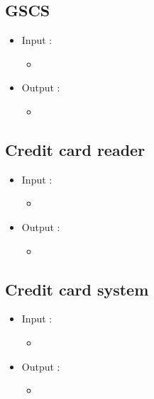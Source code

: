 \documentclass[11pt, a4paper]{article}
\begin{document}
\subsection{GSCS}

\begin{itemize}
\item Input :
		\begin{itemize}
		\item 
		\end{itemize}

\item Output :
		\begin{itemize}
		\item 
		\end{itemize}
\end{itemize}



\subsection{Credit card reader}

\begin{itemize}
\item Input :
		\begin{itemize}
		\item 
		\end{itemize}

\item Output :
		\begin{itemize}
		\item 
		\end{itemize}
\end{itemize}



\subsection{Credit card system}

\begin{itemize}
\item Input :
		\begin{itemize}
		\item 
		\end{itemize}

\item Output :
		\begin{itemize}
		\item 
		\end{itemize}
\end{itemize}
\end{document}
